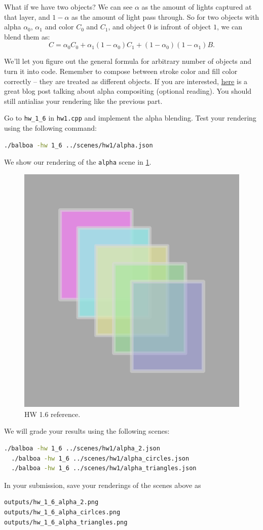 What if we have two objects? We can see $\alpha$ as the amount of lights captured at that layer, and $1-\alpha$ as the amount of light pass through. So for two objects with alpha $\alpha_0$, $\alpha_1$ and color $C_0$ and $C_1$, and object $0$ is infront of object $1$, we can blend them as:
\begin{equation}
C = \alpha_0 C_0 + \alpha_1 (1 - \alpha_0) C_1 + (1 - \alpha_0) (1 - \alpha_1) B.
\end{equation}

We'll let you figure out the general formula for arbitrary number of objects and turn it into code. 
Remember to compose between stroke color and fill color correctly -- they are treated as different objects.
If you are interested, \href{https://ciechanow.ski/alpha-compositing/}{here} is a great blog post talking about alpha compositing (optional reading). You should still antialias your rendering like the previous part.

Go to \lstinline{hw_1_6} in \lstinline{hw1.cpp} and implement the alpha blending. Test your rendering using the following command:
\begin{lstlisting}[language=bash]
  ./balboa -hw 1_6 ../scenes/hw1/alpha.json
\end{lstlisting}
We show our rendering of the \lstinline{alpha} scene in \cref{fig:hw1_6}.

\begin{figure}[ht]
    \centering
    \includegraphics[width=0.5\linewidth]{imgs/hw_1_6.png}
    \caption{HW 1.6 reference.}
    \label{fig:hw1_6}
\end{figure}

We will grade your results using the following scenes:
\begin{lstlisting}[language=bash]
  ./balboa -hw 1_6 ../scenes/hw1/alpha_2.json
  ./balboa -hw 1_6 ../scenes/hw1/alpha_circles.json
  ./balboa -hw 1_6 ../scenes/hw1/alpha_triangles.json
\end{lstlisting}
In your submission, save your renderings of the scenes above as
\begin{lstlisting}[language=bash]
outputs/hw_1_6_alpha_2.png
outputs/hw_1_6_alpha_cirlces.png
outputs/hw_1_6_alpha_triangles.png
\end{lstlisting}


